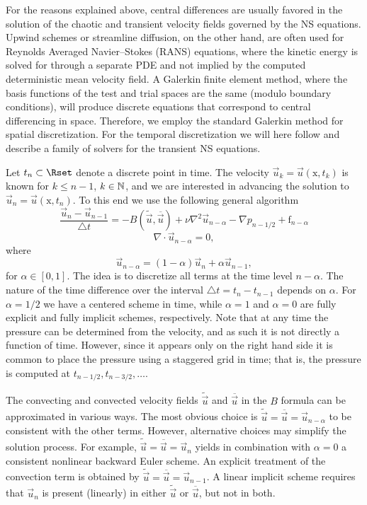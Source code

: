 For the reasons explained above, central differences are usually
favored in the solution of the chaotic and transient velocity fields
governed by the NS equations. Upwind schemes or streamline diffusion,
on the other hand, are often used for Reynolds Averaged Navier--Stokes
(RANS) equations, where the kinetic energy is solved for through a
separate PDE and not implied by the computed deterministic mean
velocity field. A Galerkin finite element method, where the basis
functions of the test and trial spaces are the same (modulo boundary
conditions), will produce discrete equations that correspond to
central differencing in space. Therefore, we employ the standard
Galerkin method for spatial discretization. For the temporal
discretization we will here follow
\citet{SimoArmero1994} and describe a family of solvers for the
transient NS equations.

Let $t_n \subset \Rset$ denote a discrete point in time. The velocity
$\vec{u}_k=\vec{u}(\text{x},t_k)$ is known for $k\leqslant n-1$, $k \in
\mathbb{N}$, and we are interested in advancing the solution to
$\vec{u}_{n}=\vec{u}(\text{x},t_{n})$. To this end we use the
following general algorithm
\begin{equation}
\label{eq:mortensen:NS_d} \frac{\vec{u}_{n}-\vec{u}_{n-1}}{\triangle t} = - B(\tilde{\vec{u}},\overline{\vec{u}}) + \nu \nabla^2 \vec{u}_{n-\alpha} -\nabla p_{n-1/2} + \text{f}_{n-\alpha}
\end{equation}
\begin{equation}
 \label{eq:mortensen:cont_d} \nabla \cdot \vec{u}_{n-\alpha} =0,
\end{equation}
where
\begin{equation}
   \vec{u}_{n-\alpha}=(1-\alpha) \vec{u}_{n} + \alpha \vec{u}_{n-1},
\end{equation}
for $\alpha \in [0,1]$.  The idea is to discretize all terms at the
time level $n-\alpha$. The nature of the time difference over the
interval $\triangle t = t_{n}-t_{n-1}$ depends on $\alpha$. For
$\alpha =1/2$ we have a centered scheme in time, while $\alpha =1$ and
$\alpha=0$ are fully explicit and fully implicit schemes,
respectively. Note that at any time the pressure can be determined
from the velocity, and as such it is not directly a function of
time. However, since it appears only on the right hand side it is
common to place the pressure using a staggered grid in time; that is,
the pressure is computed at $t_{n-1/2}, t_{n-3/2}, \ldots$.

The convecting and convected velocity fields $\tilde{\vec{u}}$ and
$\overline{\vec{u}}$ in the $B$ formula can be approximated in various
ways. The most obvious choice is
$\tilde{\vec{u}}=\overline{\vec{u}}=\vec{u}_{n-\alpha}$ to be
consistent with the other terms. However, alternative choices may
simplify the solution process. For example,
$\tilde{\vec{u}}=\overline{\vec{u}}=\vec{u}_{n}$ yields in combination
with $\alpha=0$ a consistent nonlinear backward Euler scheme. An
explicit treatment of the convection term is obtained by
$\tilde{\vec{u}} = \overline{\vec{u}} = \vec{u}_{n-1}$.  A linear
implicit scheme requires that $\vec{u}_{n}$ is present (linearly) in
either $\tilde{\vec{u}}$ or $\overline{\vec{u}}$, but not in both.

